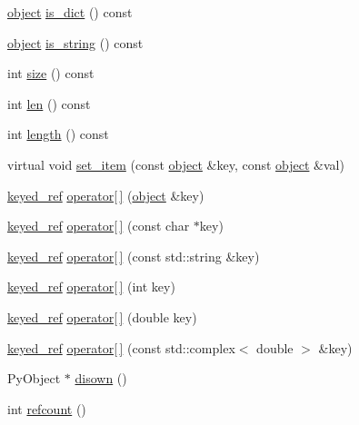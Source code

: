 \begin{DoxyCompactItemize}
\item 
\hyperlink{classpy_1_1object}{object} \hyperlink{classpy_1_1object_ae0cf2272b3c008ac7914033b19818dc3}{is\+\_\+dict} () const 
\item 
\hyperlink{classpy_1_1object}{object} \hyperlink{classpy_1_1object_a203cd54516f26b8a18f24d9bee461219}{is\+\_\+string} () const 
\item 
int \hyperlink{classpy_1_1object_a1ad49df7b8f541c1f3d4ff93f582ac61}{size} () const 
\item 
int \hyperlink{classpy_1_1object_a5ec3f15f8dc80f0621b918c187f23a6d}{len} () const 
\item 
int \hyperlink{classpy_1_1object_a1d5ab056cac46f3f54f68c15a06e8c66}{length} () const 
\item 
virtual void \hyperlink{classpy_1_1object_a4a107b238581a4f58c302df834ccd141}{set\+\_\+item} (const \hyperlink{classpy_1_1object}{object} \&key, const \hyperlink{classpy_1_1object}{object} \&val)
\item 
\hyperlink{classpy_1_1object_1_1keyed__ref}{keyed\+\_\+ref} \hyperlink{classpy_1_1object_abde3fe7d8e2259f68ebb7724474900d5}{operator\mbox{[}$\,$\mbox{]}} (\hyperlink{classpy_1_1object}{object} \&key)
\item 
\hyperlink{classpy_1_1object_1_1keyed__ref}{keyed\+\_\+ref} \hyperlink{classpy_1_1object_a57ffab04eb97b684e14746bad95757ee}{operator\mbox{[}$\,$\mbox{]}} (const char $\ast$key)
\item 
\hyperlink{classpy_1_1object_1_1keyed__ref}{keyed\+\_\+ref} \hyperlink{classpy_1_1object_ac09ea5c322a4aada90ae363199df0ae6}{operator\mbox{[}$\,$\mbox{]}} (const std\+::string \&key)
\item 
\hyperlink{classpy_1_1object_1_1keyed__ref}{keyed\+\_\+ref} \hyperlink{classpy_1_1object_a3f38cf90638a26aa0ac74158c7a3f674}{operator\mbox{[}$\,$\mbox{]}} (int key)
\item 
\hyperlink{classpy_1_1object_1_1keyed__ref}{keyed\+\_\+ref} \hyperlink{classpy_1_1object_a908a8fb9cea6f5b0befac4aabf224f8c}{operator\mbox{[}$\,$\mbox{]}} (double key)
\item 
\hyperlink{classpy_1_1object_1_1keyed__ref}{keyed\+\_\+ref} \hyperlink{classpy_1_1object_a96431c869b98cd6dadc9c24686fc424f}{operator\mbox{[}$\,$\mbox{]}} (const std\+::complex$<$ double $>$ \&key)
\item 
Py\+Object $\ast$ \hyperlink{classpy_1_1object_a627f13360bf5a336fe1b9925c5a92bf7}{disown} ()
\item 
int \hyperlink{classpy_1_1object_aace56f6a0ef0fd3ba00fcdbbd3402af9}{refcount} ()
\end{DoxyCompactItemize}
